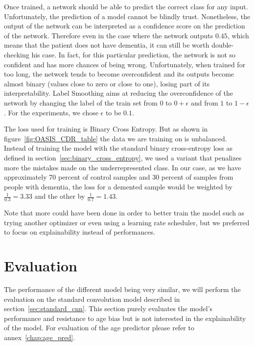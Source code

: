 Once trained, a network should be able to predict the correct class for any input. Unfortunately, the prediction of a model cannot be blindly trust. Nonetheless, the output of the network can be interpreted as a confidence score on the prediction of the network. Therefore even in the case where the network outputs $0.45$, which means that the patient does not have dementia, it can still be worth double-checking his case. In fact, for this particular prediction, the network is not so confident and has more chances of being wrong. Unfortunately, when trained for too long, the network tends to become overconfident and its outputs become almost binary (values close to zero or close to one), losing part of its interpretability. Label Smoothing \cite{label_smoothing_szegedy2015rethinking} aims at reducing the overconfidence of the network by changing the label of the train set from $0$ to $0 + \epsilon$ and from $1$ to $1 - \epsilon$. For the experiments, we chose $\epsilon$ to be $0.1$.

The loss used for training is Binary Cross Entropy. But as shown in figure~\ref{fig:OASIS_CDR_table} the data we are training on is unbalanced. Instead of training the model with the standard binary cross-entropy loss as defined in section~\ref{sec:binary_cross_entropy}, we used a variant that penalizes more the mistakes made on the underrepresented class. In our case, as we have approximately 70 percent of control samples and 30 percent of samples from people with dementia, the loss for a demented sample would be weighted by $\frac{1}{0.3} = 3.33$ and the other by $\frac{1}{0.7} = 1.43$.

Note that more could have been done in order to better train the model such as trying another optimizer or even using a learning rate scheduler, but we preferred to focus on explainability instead of performances.

\section{Evaluation}
The performance of the different model being very similar, we will perform the evaluation on the standard convolution model described in section~\ref{sec:standard_cnn}. This section purely evaluates the model's performance and resistance to age bias but is not interested in the explainability of the model. For evaluation of the age predictor please refer to annex~\ref{chap:age_pred}. 


